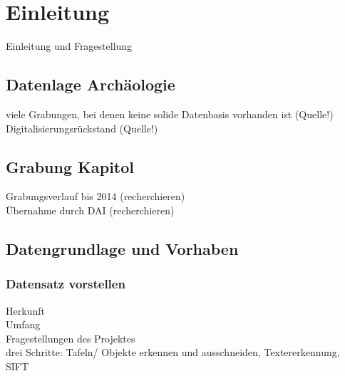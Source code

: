 \section{Einleitung}

Einleitung und Fragestellung\\

\subsection{Datenlage Archäologie}
viele Grabungen, bei denen keine solide Datenbasis vorhanden ist (Quelle!)\\
Digitalisierungsrückstand (Quelle!)\\

\subsection{Grabung Kapitol}
Grabungsverlauf bis 2014 (recherchieren)\\
Übernahme durch DAI (recherchieren)\\

\subsection{Datengrundlage und Vorhaben}
\subsubsection{Datensatz vorstellen}
Herkunft\\
Umfang\\
Fragestellungen des Projektes\\

drei Schritte: Tafeln/ Objekte erkennen und ausschneiden, Textererkennung, SIFT\\
